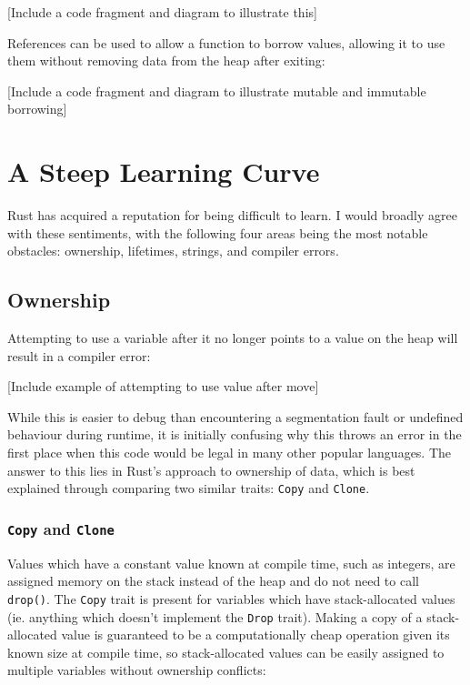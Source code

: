 \documentclass{l4proj}
\begin{document}
[Include a code fragment and diagram to illustrate this]

References can be used to allow a function to borrow values, allowing it to use them without removing data from the heap after exiting:

[Include a code fragment and diagram to illustrate mutable and immutable borrowing]


\section{A Steep Learning Curve}
Rust has acquired a reputation for being difficult to learn.\cite{rust-difficulty2}\cite{rust-difficulty3}\cite{rust-difficulty1} I would broadly agree with these sentiments, with the following four areas being the most notable obstacles: ownership, lifetimes, strings, and compiler errors.

\subsection{Ownership}
Attempting to use a variable after it no longer points to a value on the heap will result in a compiler error:

[Include example of attempting to use value after move]

While this is easier to debug than encountering a segmentation fault or undefined behaviour during runtime, it is initially confusing why this throws an error in the first place when this code would be legal in many other popular languages. The answer to this lies in Rust's approach to ownership of data, which is best explained through comparing two similar traits: \texttt{Copy} and \texttt{Clone}.

\subsubsection{\texttt{Copy} and \texttt{Clone}}
Values which have a constant value known at compile time, such as integers, are assigned memory on the stack instead of the heap and do not need to call \texttt{drop()}. The \texttt{Copy} trait is present for variables which have stack-allocated values (ie. anything which doesn't implement the \texttt{Drop} trait). Making a copy of a stack-allocated value is guaranteed to be a computationally cheap operation given its known size at compile time, so stack-allocated values can be easily assigned to multiple variables without ownership conflicts:
\end{document}
